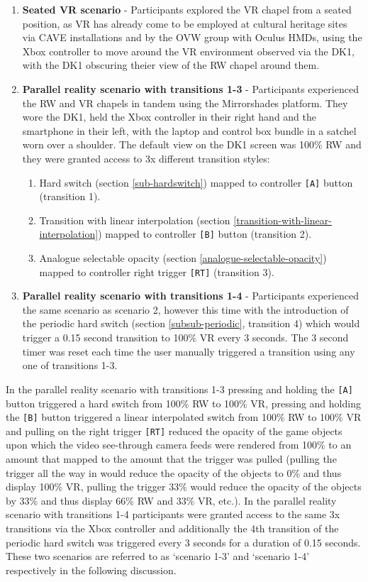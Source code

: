 \begin{enumerate}
	\item \textbf{Seated VR scenario} - Participants explored the VR chapel from a seated position, as VR has already come to be employed at cultural heritage sites via CAVE installations and by the OVW group with Oculus HMDs, using the Xbox controller to move around the VR environment observed via the DK1, with the DK1 obscuring theier view of the RW chapel around them.
	\item \textbf{Parallel reality scenario with transitions 1-3} - Participants experienced the RW and VR chapels in tandem using the Mirrorshades platform. They wore the DK1, held the Xbox controller in their right hand and the smartphone in their left, with the laptop and control box bundle in a satchel worn over a shoulder. The default view on the DK1 screen was 100\% RW and they were granted access to 3x different transition styles:
	\begin{enumerate}
		\item Hard switch (section \ref{sub-hardswitch}) mapped to controller \texttt{[A]} button (transition 1).
		\item Transition with linear interpolation (section \ref{transition-with-linear-interpolation}) mapped to controller \texttt{[B]} button (transition 2).
		\item Analogue selectable opacity (section \ref{analogue-selectable-opacity}) mapped to controller right trigger \texttt{[RT]} (transition 3).
\end{enumerate}
	\item \textbf{Parallel reality scenario with transitions 1-4} - Participants experienced the same scenario as scenario 2, however this time with the introduction of the periodic hard switch (section \ref{subsub-periodic}, transition 4) which would trigger a 0.15 second transition to 100\% VR every 3 seconds. The 3 second timer was reset each time the user manually triggered a transition using any one of transitions 1-3.
\end{enumerate}

In the parallel reality scenario with transitions 1-3 pressing and holding the \texttt{[A]} button triggered a hard switch from 100\% RW to 100\% VR, pressing and holding the \texttt{[B]} button triggered a linear interpolated switch from 100\% RW to 100\% VR and pulling on the right trigger \texttt{[RT]} reduced the opacity of the game objects upon which the video see-through camera feeds were rendered from 100\% to an amount that mapped to the amount that the trigger was pulled (pulling the trigger all the way in would reduce the opacity of the objects to 0\% and thus display 100\% VR, pulling the trigger 33\% would reduce the opacity of the objects by 33\% and thus display 66\% RW and 33\% VR, etc.). In the parallel reality scenario with transitions 1-4 participants were granted access to the same 3x transitions via the Xbox controller and additionally the 4th transition of the periodic hard switch was triggered every 3 seconds for a duration of 0.15 seconds. These two scenarios are referred to as `scenario 1-3' and `scenario 1-4' respectively in the following discussion.

